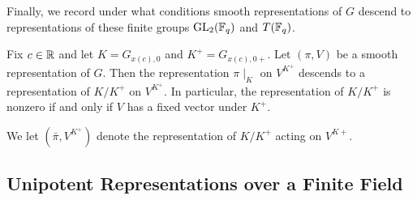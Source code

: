 Finally, we record under what conditions smooth representations of $G$ descend to representations of these finite groups $\mathrm{GL}_2(\mathbb{F}_q)$ and $T(\mathbb{F}_q)$.

\begin{lemma}
    Fix $c \in \mathbb{R}$ and let $K=G_{x(c),0}$ and $K^+ =G_{x(c),0+}$. Let $(\pi,V)$ be a smooth representation of $G$. Then the representation $\pi\mid_{K}$ on $V^{K^+}$ descends to a representation of $K/K^+$ on $V^{K^+}$. In particular, the representation of $K/K^+$ is nonzero if and only if $V$ has a fixed vector under $K^+$.
\end{lemma}

\begin{notn}
    We let $(\bar{\pi},V^{K^+})$ denote the representation of $K/K^+$ acting on $V^{K+}$.
\end{notn}


\subsection{Unipotent Representations over a Finite Field}

